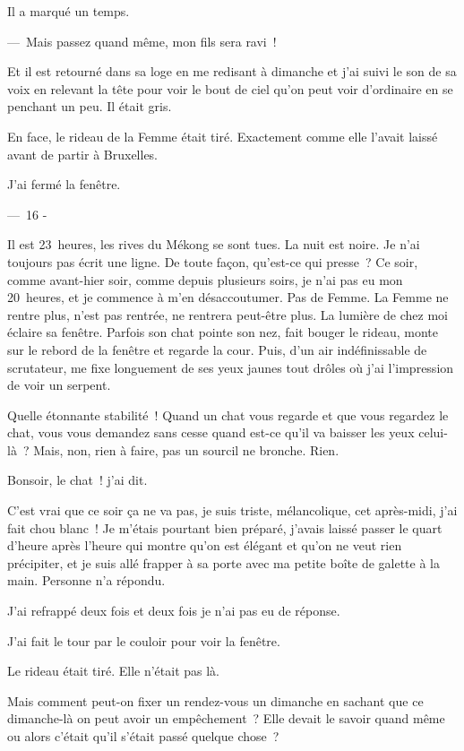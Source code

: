 \documentclass[twoside]{book} %
\begin{document}
Il a marqué un temps.\par
— Mais passez quand même, mon fils sera ravi !\par
Et il est retourné dans sa loge en me redisant à dimanche et j’ai suivi le son de sa voix en relevant la tête pour voir le bout de ciel qu’on peut voir d’ordinaire en se penchant un peu. Il était gris.\par
En face, le rideau de la Femme était tiré. Exactement comme elle l’avait laissé avant de partir à Bruxelles.\par
J’ai fermé la fenêtre.\par
\bigbreak
{\centering — 16 -\par}
\bigbreak
\noindent Il est 23 heures, les rives du Mékong se sont tues. La nuit est noire. Je n’ai toujours pas écrit une ligne. De toute façon, qu’est-ce qui presse ? Ce soir, comme avant-hier soir, comme depuis plusieurs soirs, je n’ai pas eu mon 20 heures, et je commence à m’en désaccoutumer. Pas de Femme. La Femme ne rentre plus, n’est pas rentrée, ne rentrera peut-être plus. La lumière de chez moi éclaire sa fenêtre. Parfois son chat pointe son nez, fait bouger le rideau, monte sur le rebord de la fenêtre et regarde la cour. Puis, d’un air indéfinissable de scrutateur, me fixe longuement de ses yeux jaunes tout drôles où j’ai l’impression de voir un serpent.\par
Quelle étonnante stabilité ! Quand un chat vous regarde et que vous regardez le chat, vous vous demandez sans cesse quand est-ce qu’il va baisser les yeux celui-là ? Mais, non, rien à faire, pas un sourcil ne bronche. Rien.\par
Bonsoir, le chat ! j’ai dit.\par
C’est vrai que ce soir ça ne va pas, je suis triste, mélancolique, cet après-midi, j’ai fait chou blanc ! Je m’étais pourtant bien préparé, j’avais laissé passer le quart d’heure après l’heure qui montre qu’on est élégant et qu’on ne veut rien précipiter, et je suis allé frapper à sa porte avec ma petite boîte de galette à la main. Personne n’a répondu.\par
J’ai refrappé deux fois et deux fois je n’ai pas eu de réponse.\par
J’ai fait le tour par le couloir pour voir la fenêtre.\par
Le rideau était tiré. Elle n’était pas là.\par
Mais comment peut-on fixer un rendez-vous un dimanche en sachant que ce dimanche-là on peut avoir un empêchement ? Elle devait le savoir quand même ou alors c’était qu’il s’était passé quelque chose ?\par
\end{document}
